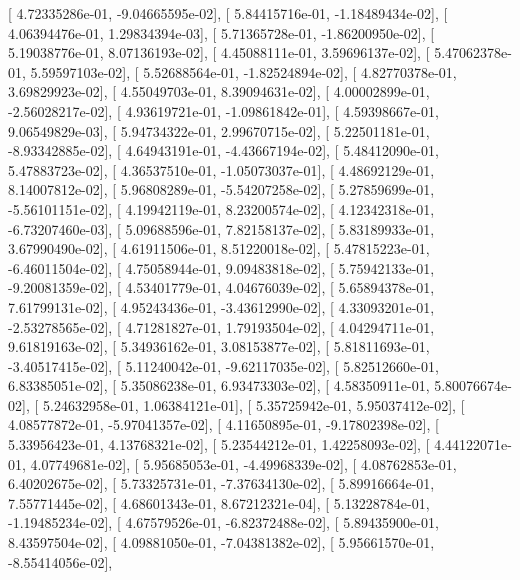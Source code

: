 \documentclass{article}
\begin{document}
       [  4.72335286e-01,  -9.04665595e-02],
       [  5.84415716e-01,  -1.18489434e-02],
       [  4.06394476e-01,   1.29834394e-03],
       [  5.71365728e-01,  -1.86200950e-02],
       [  5.19038776e-01,   8.07136193e-02],
       [  4.45088111e-01,   3.59696137e-02],
       [  5.47062378e-01,   5.59597103e-02],
       [  5.52688564e-01,  -1.82524894e-02],
       [  4.82770378e-01,   3.69829923e-02],
       [  4.55049703e-01,   8.39094631e-02],
       [  4.00002899e-01,  -2.56028217e-02],
       [  4.93619721e-01,  -1.09861842e-01],
       [  4.59398667e-01,   9.06549829e-03],
       [  5.94734322e-01,   2.99670715e-02],
       [  5.22501181e-01,  -8.93342885e-02],
       [  4.64943191e-01,  -4.43667194e-02],
       [  5.48412090e-01,   5.47883723e-02],
       [  4.36537510e-01,  -1.05073037e-01],
       [  4.48692129e-01,   8.14007812e-02],
       [  5.96808289e-01,  -5.54207258e-02],
       [  5.27859699e-01,  -5.56101151e-02],
       [  4.19942119e-01,   8.23200574e-02],
       [  4.12342318e-01,  -6.73207460e-03],
       [  5.09688596e-01,   7.82158137e-02],
       [  5.83189933e-01,   3.67990490e-02],
       [  4.61911506e-01,   8.51220018e-02],
       [  5.47815223e-01,  -6.46011504e-02],
       [  4.75058944e-01,   9.09483818e-02],
       [  5.75942133e-01,  -9.20081359e-02],
       [  4.53401779e-01,   4.04676039e-02],
       [  5.65894378e-01,   7.61799131e-02],
       [  4.95243436e-01,  -3.43612990e-02],
       [  4.33093201e-01,  -2.53278565e-02],
       [  4.71281827e-01,   1.79193504e-02],
       [  4.04294711e-01,   9.61819163e-02],
       [  5.34936162e-01,   3.08153877e-02],
       [  5.81811693e-01,  -3.40517415e-02],
       [  5.11240042e-01,  -9.62117035e-02],
       [  5.82512660e-01,   6.83385051e-02],
       [  5.35086238e-01,   6.93473303e-02],
       [  4.58350911e-01,   5.80076674e-02],
       [  5.24632958e-01,   1.06384121e-01],
       [  5.35725942e-01,   5.95037412e-02],
       [  4.08577872e-01,  -5.97041357e-02],
       [  4.11650895e-01,  -9.17802398e-02],
       [  5.33956423e-01,   4.13768321e-02],
       [  5.23544212e-01,   1.42258093e-02],
       [  4.44122071e-01,   4.07749681e-02],
       [  5.95685053e-01,  -4.49968339e-02],
       [  4.08762853e-01,   6.40202675e-02],
       [  5.73325731e-01,  -7.37634130e-02],
       [  5.89916664e-01,   7.55771445e-02],
       [  4.68601343e-01,   8.67212321e-04],
       [  5.13228784e-01,  -1.19485234e-02],
       [  4.67579526e-01,  -6.82372488e-02],
       [  5.89435900e-01,   8.43597504e-02],
       [  4.09881050e-01,  -7.04381382e-02],
       [  5.95661570e-01,  -8.55414056e-02],
\end{document}
